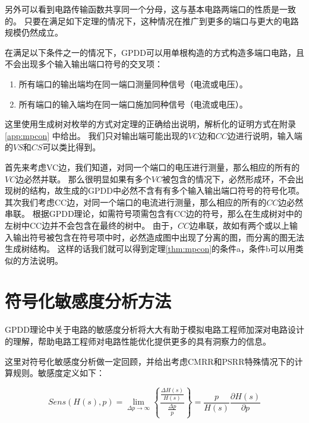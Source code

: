 另外可以看到电路传输函数共享同一个分母，这与基本电路两端口的性质是一致的。
只要在满足如下定理的情况下，这种情况在推广到更多的端口与更大的电路规模仍然成立。

\begin{thm}\label{thm:mpcon}
	在满足以下条件之一的情况下，GPDD可以用单根构造的方式构造多端口电路，且不会出现多个输入输出端口符号的交叉项：
	\begin{enumerate}[label=\emph{\alph*})]
		\item 所有端口的输出端均在同一端口测量同种信号（电流或电压）。
		\item 所有端口的输入端均在同一端口施加同种信号（电流或电压）。
	\end{enumerate}
\end{thm}

这里使用生成树对枚举的方式对定理的正确给出说明，解析化的证明方式在附录\ref{app:mpcon} 中给出。
我们只对输出端可能出现的$VC$边和$CC$边进行说明，输入端的$VS$和$CS$可以类比得到。

首先来考虑VC边，我们知道，对同一个端口的电压进行测量，那么相应的所有的$VC$边必然并联。
那么很明显如果有多个$VC$被包含的情况下，必然形成环，不会出现树的结构，故生成的GPDD中必然不含有有多个输入输出端口符号的符号化项。
其次我们考虑CC边，对同一个端口的电流进行测量，那么相应的所有的$CC$边必然串联。
根据GPDD理论\parencite{GShi-GPDD}，如需符号项需包含有CC边的符号，那么在生成树对中的左树中CC边并不会包含在最终的树中。
由于，$CC$边串联，故如有两个或以上输入输出符号被包含在符号项中时，必然造成图中出现了分离的图，而分离的图无法生成树结构。
这样的话我们就可以得到定理\ref{thm:mpcon}的条件a，条件b可以用类似的方法说明。

\section{符号化敏感度分析方法}

GPDD理论中关于电路的敏感度分析将大大有助于模拟电路工程师加深对电路设计的理解，帮助电路工程师对电路性能优化提供更多的具有洞察力的信息\parencite{MengXiaoxuan-Sens-2009,WengBinbin-Sens-2011,ChenJiajun-Sens-2012}。

这里对符号化敏感度分析做一定回顾，并给出考虑CMRR和PSRR特殊情况下的计算规则。敏感度定义如下：

\begin{equation}
Sens\left( {H\left( s \right),p} \right) = \mathop {\lim }\limits_{\Delta p \to \infty } \left\{ {\frac{{\frac{{\Delta H\left( s \right)}}{{H\left( s \right)}}}}{{\frac{{\Delta p}}{p}}}} \right\} = \frac{p}{{H\left( s \right)}}\frac{{\partial H\left( s \right)}}{{\partial p}}
\end{equation}

